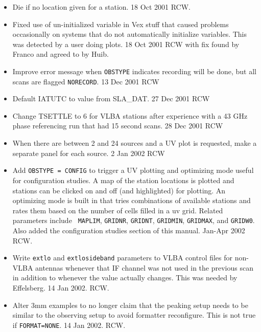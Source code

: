 \documentclass{report}
\begin{document}
\begin{itemize}

\item  Die if no location given for a station.  18 Oct 2001 RCW.

\item  Fixed use of un-initialized variable in Vex stuff that caused
problems occasionally on systems that do not automatically initialize
variables.  This was detected by a user doing plots.  18 Oct 2001 RCW
with fix found by Franco and agreed to by Huib.

\item  Improve error message when {\tt OBSTYPE} indicates recording
will be done, but all scans are flagged {\tt NORECORD}.  13 Dec 2001 RCW

\item  Default IATUTC to value from SLA\_DAT.  27 Dec 2001 RCW

\item  Change TSETTLE to 6 for VLBA stations after experience with
a 43 GHz phase referencing run that had 15 second scans.  28 Dec 2001 RCW

\item  When there are between 2 and 24 sources and a UV plot is requested,
make a separate panel for each source.  2 Jan 2002 RCW

\item Add {\tt OBSTYPE = CONFIG} to trigger a UV plotting and
optimizing mode useful for configuration studies.  A map of the
station locations is plotted and stations can be clicked on and off
(and highlighted) for plotting.  An optimizing mode is built in that
tries combinations of available stations and rates them based on the
number of cells filled in a uv grid.  Related parameters include {\tt
MAPLIM}, {\tt GRIDNR}, {\tt GRIDNT}, {\tt GRIDMIN}, {\tt GRIDMAX}, and
{\tt GRIDW0}.  Also added the configuration studies section of this
manual.  Jan-Apr 2002 RCW.

\item Write {\tt extlo} and {\tt extlosideband} parameters to VLBA
control files for non-VLBA antennas whenever that IF channel was
not used in the previous scan in addition to whenever the value
actually changes.  This was needed by Effelsberg.  14 Jan 2002. RCW.

\item Alter 3mm examples to no longer claim that the peaking setup
needs to be similar to the observing setup to avoid formatter
reconfigure.  This is not true if {\tt FORMAT=NONE}.  14 Jan 2002. RCW.


\end{itemize}
\end{document}
